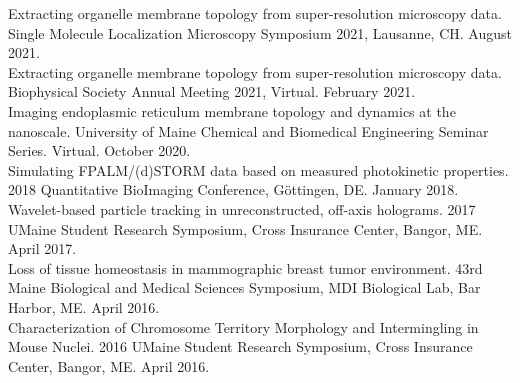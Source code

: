  {
    Extracting organelle membrane topology from super-resolution microscopy data. Single Molecule Localization Microscopy Symposium 2021, Lausanne, CH. August 2021. \\

    Extracting organelle membrane topology from super-resolution microscopy data. Biophysical Society Annual Meeting 2021, Virtual. February 2021. \\

    Imaging endoplasmic reticulum membrane topology and dynamics at the nanoscale. University of Maine Chemical and Biomedical Engineering Seminar Series. Virtual. October 2020. \\
    
    Simulating FPALM/(d)STORM data based on measured photokinetic properties. 2018 Quantitative BioImaging Conference, Göttingen, DE. January 2018. \\

    Wavelet-based particle tracking in unreconstructed, off-axis holograms. 2017 UMaine Student Research Symposium, Cross Insurance Center, Bangor, ME. April 2017. \\

    Loss of tissue homeostasis in mammographic breast tumor environment. 43rd Maine Biological and Medical Sciences Symposium, MDI Biological Lab, Bar Harbor, ME. April 2016. \\

    Characterization of Chromosome Territory Morphology and Intermingling in Mouse Nuclei. 2016 UMaine Student Research Symposium, Cross Insurance Center, Bangor, ME. April 2016. \\
}

\vspace{11pt}
